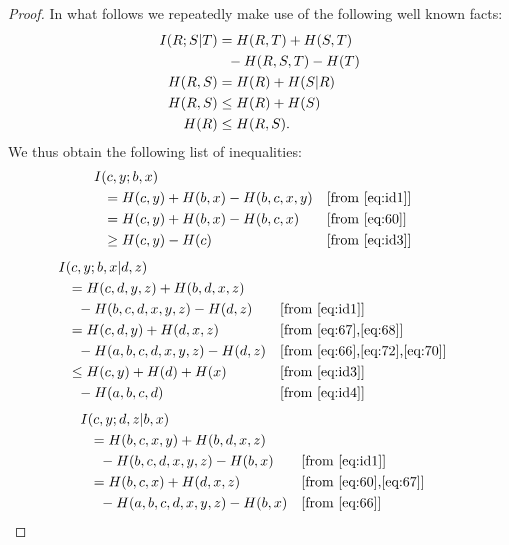 \documentclass[10pt,journal]{IEEEtran}
\begin{document}
\begin{proof}
In what follows we repeatedly make use of the following well known facts:
%
\begin{align}
I(R;S|T) &= H(R,T) + H(S,T)\notag\\
         &\ \  - H(R,S,T) - H(T)              \label{eq:id1}\\
H(R,S) &= H(R) + H(S|R)                       \label{eq:id2}\\
H(R,S) &\le H(R) + H(S)                       \label{eq:id3}\\
H(R)   &\le H(R,S).                           \label{eq:id4}
\end{align}
%
We thus obtain the following list of inequalities:
%
\begin{align}
&   I(c,y;b,x) \notag\\
             &\ \ = H(c,y) + H(b,x) - H(b,c,x,y)   & & [\mbox{from \eqref{eq:id1}}] \notag\\
             &\ \ = H(c,y) + H(b,x) - H(b,c,x)     & & [\mbox{from \eqref{eq:60}}] \notag\\
             &\ \ \ge H(c,y) - H(c)                & & [\mbox{from \eqref{eq:id3}}] \label{eq:101}
\end{align}
%
\begin{align}
&   I(c,y;b,x|d,z) \notag\\
             &\ \ = H(c,d,y,z) + H(b,d,x,z)\notag\\
             &\ \ \ \  - H(b,c,d,x,y,z) - H(d,z)   & & [\mbox{from \eqref{eq:id1}}] \notag\\
             &\ \ = H(c,d,y) + H(d,x,z)            & & [\mbox{from \eqref{eq:67},\eqref{eq:68}}] \notag\\
             &\ \ \ \  - H(a,b,c,d,x,y,z) - H(d,z) & & [\mbox{from \eqref{eq:66},\eqref{eq:72},\eqref{eq:70}}] \notag\\
             &\ \ \le H(c,y) + H(d) + H(x)         & & [\mbox{from \eqref{eq:id3}}] \notag\\
             &\ \ \ \  - H(a,b,c,d)                & & [\mbox{from \eqref{eq:id4}}]
\end{align}
%
\begin{align}
&   I(c,y;d,z|b,x) \notag\\
             &\ \ = H(b,c,x,y) + H(b,d,x,z)\notag\\
             &\ \ \ \  - H(b,c,d,x,y,z) - H(b,x)   & \Comment{\eqref{eq:id1}} \notag\\
             &\ \ = H(b,c,x) + H(d,x,z)            & \Comment{\eqref{eq:60},\eqref{eq:67}} \notag\\
             &\ \ \ \  - H(a,b,c,d,x,y,z) - H(b,x) & \Comment{\eqref{eq:66}} \notag\\

\end{align}
\end{proof}
\end{document}
